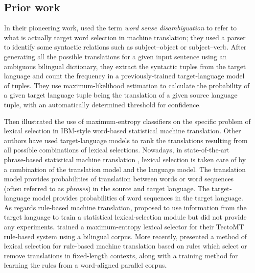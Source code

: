 \documentclass[11pt]{article}
\newcommand{\comment}[1]{\todo{#1}}
\begin{document}

\subsection{Prior work}
In their
pioneering work, \cite{dagan1994word} used the term
\emph{word sense disambiguation} to refer to what is actually target
word selection in machine translation; they used a parser to identify
some syntactic relations such as subject--object or subject--verb.
After generating all the possible translations for a given
input sentence using an ambiguous bilingual dictionary, they extract the syntactic
tuples from the target language and count the frequency in a previously-trained target-language 
model of tuples.  They use maximum-likelihood estimation to calculate the probability of a given 
target language tuple being the translation of a given source language tuple, with
an automatically determined threshold for confidence.

Then \cite{berger1996} illustrated the use of maximum-entropy classifiers
on the specific problem of lexical selection in IBM-style word-based
statistical machine translation. Other authors
\citep{melero07a} have used target-language models to rank %
the translations resulting from all possible combinations of lexical
selections.  Nowadays, in state-of-the-art phrase-based statistical
machine translation \citep{koehn2009statistical}, lexical selection is
taken care of by a combination of the translation model and the
language model. The translation model provides probabilities of
translation between words or word sequences (often referred to as
\emph{phrases}) in the source and target language. The target-language
model provides probabilities of word sequences in the target language.
As regards rule-based machine translation, \cite{sanchez07a} proposed 
to use information from the target language to train a statistical 
lexical-selection module but did not provide any experiments. 
\cite{marechek10} trained a maximum-entropy lexical selector for their TectoMT rule-based system
using a bilingual corpus.  More recently, \cite{tyers12a} presented a
method of lexical selection for rule-based machine translation based
on rules which select or remove translations in fixed-length contexts,
along with a training method for learning the rules from a
word-aligned parallel corpus. 
\end{document}
